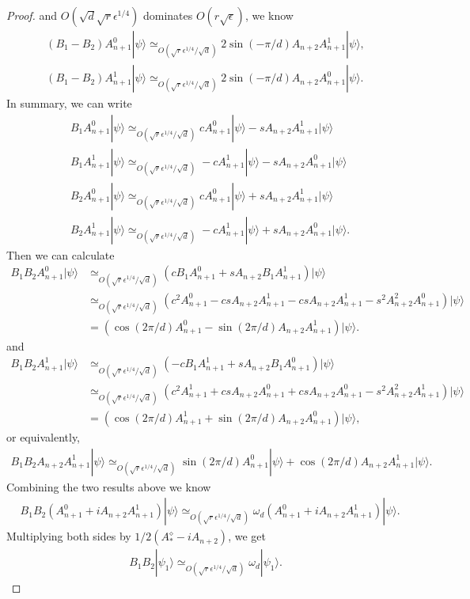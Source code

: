 \documentclass[11pt,letterpaper]{article}
\newcommand{\ket}[1]{|#1\rangle}
\newcommand{\1}{\mathbb{1}}
\newcommand{\se}{\sqrt{\epsilon}}
\newcommand{\qe}{\epsilon^{1/4}}
\newcommand{\sd}{\sqrt{d}}
\newcommand{\sr}{\sqrt{r}}
\newcommand{\appd}[1]{\simeq_{#1}}
\theoremstyle{definition}
\begin{document}
\begin{proof}
	and $O(\sd \sr \qe)$ dominates $O(r \se)$, we know
	\begin{align}
		(B_1-B_2) A_{n+1}^0 \ket{\psi} \appd{O(\sr\qe/\sd )} 2 \sin(-\pi/d)A_{n+2} A_{n+1}^1 \ket{\psi},\\
		(B_1-B_2) A_{n+1}^1 \ket{\psi}\appd{O(\sr\qe/\sd )} 2 \sin(-\pi/d)A_{n+2} A_{n+1}^0 \ket{\psi}.
	\end{align}
	In summary, we can write 
        \begin{align}
        		&B_1A_{n+1}^0 \ket{\psi} \appd{O(\sr \qe/ \sd)} cA_{n+1}^0\ket{\psi} - sA_{n+2}A_{n+1}^1\ket{\psi}\\
        		&B_1A_{n+1}^1 \ket{\psi} \appd{O(\sr \qe/ \sd)} -cA_{n+1}^1\ket{\psi} - sA_{n+2}A_{n+1}^0\ket{\psi}\\
        		&B_2A_{n+1}^0 \ket{\psi} \appd{O( \sr \qe /\sd)} cA_{n+1}^0\ket{\psi} + sA_{n+2}A_{n+1}^1\ket{\psi}\\
        		&B_2A_{n+1}^1 \ket{\psi} \appd{O(\sr \qe/ \sd )} -cA_{n+1}^1\ket{\psi} + sA_{n+2}A_{n+1}^0\ket{\psi}.
        \end{align}
        Then we can calculate
        \begin{align}
        		B_1B_2 A_{n+1}^0 \ket{\psi} &\appd{O(\sr \qe/\sd)} (c B_1A_{n+1}^0 +sA_{n+2}B_1A_{n+1}^1)\ket{\psi}\\
        		&\appd{O( \sr \qe/\sd)}(c^2A_{n+1}^0- csA_{n+2}A_{n+1}^1 -csA_{n+2}A_{n+1}^1 -s^2 A_{n+2}^2 A_{n+1}^0)\ket{\psi}\\
        		&= (\cos(2\pi/d) A_{n+1}^0 - \sin(2\pi/d) A_{n+2}A_{n+1}^1)\ket{\psi}.
        \end{align}
        and 
        \begin{align}
        		B_1B_2 A_{n+1}^1 \ket{\psi} &\appd{O( \sr \qe/\sd)} (-c B_1A_{n+1}^1 +sA_{n+2}B_1A_{n+1}^0)\ket{\psi}\\
        		&\appd{O(\sr \qe/\sd)}(c^2A_{n+1}^1+ csA_{n+2}A_{n+1}^0 +csA_{n+2}A_{n+1}^0 -s^2 A_{n+2}^2 A_{n+1}^1)\ket{\psi}\\
        		&= (\cos(2\pi/d) A_{n+1}^1 + \sin(2\pi/d) A_{n+2}A_{n+1}^0)\ket{\psi},
        \end{align}
        or equivalently,
        \begin{align}
        		B_1B_2 A_{n+2}A_{n+1}^1 \ket{\psi}\appd{O(\sr \qe/\sd)} 
		\sin(2\pi/d) A_{n+1}^0\ket{\psi} + \cos(2\pi/d)A_{n+2}A_{n+1}^1\ket{\psi}.
        \end{align}
        Combining the two results above we know
	\begin{align}
		\label{eq:omegad}&B_1B_2 (A_{n+1}^0 + i A_{n+2}A_{n+1}^1) \ket{\psi} 
		\appd{O(\sr \qe/\sd)}\omega_d(A_{n+1}^0 + iA_{n+2}A_{n+1}^1) \ket{\psi}.
	\end{align}
	Multiplying both sides by $1/2(A_\ast^\diamond - iA_{n+2})$, we get
	\begin{align}
		B_1B_2 \ket{\psi_1} \appd{O(\sr \qe/\sd)} \omega_d\ket{\psi_1}.
	\end{align}
	

\end{proof}
\end{document}
